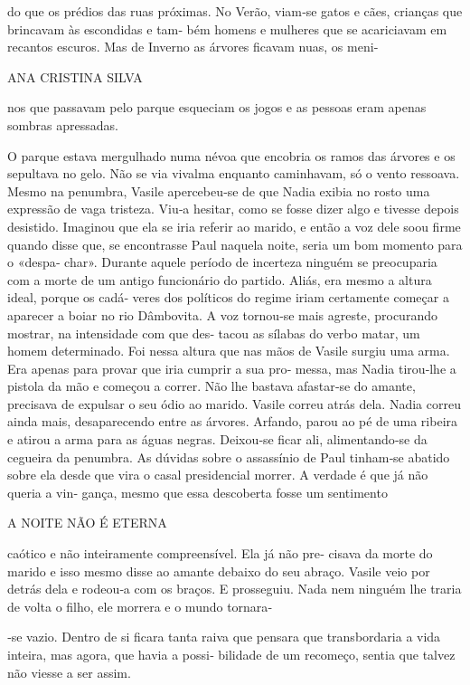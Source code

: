 do que os prédios das ruas próximas. No Verão, viam‑se gatos e cães,
crianças que brincavam às escondidas e tam‑ bém homens e mulheres que se
acariciavam em recantos escuros. Mas de Inverno as árvores ficavam nuas,
os meni‑

ANA CRISTINA SILVA

nos que passavam pelo parque esqueciam os jogos e as pessoas eram apenas
sombras apressadas.

O parque estava mergulhado numa névoa que encobria os ramos das árvores
e os sepultava no gelo. Não se via vivalma enquanto caminhavam, só o
vento ressoava. Mesmo na penumbra, Vasile apercebeu‑se de que Nadia
exibia no rosto uma expressão de vaga tristeza. Viu‑a hesitar, como se
fosse dizer algo e tivesse depois desistido. Imaginou que ela se iria
referir ao marido, e então a voz dele soou firme quando disse que, se
encontrasse Paul naquela noite, seria um bom momento para o «despa‑
char». Durante aquele período de incerteza ninguém se preocuparia com a
morte de um antigo funcionário do partido. Aliás, era mesmo a altura
ideal, porque os cadá‑ veres dos políticos do regime iriam certamente
começar a aparecer a boiar no rio Dâmbovita. A voz tornou‑se mais
agreste, procurando mostrar, na intensidade com que des‑ tacou as
sílabas do verbo matar, um homem determinado. Foi nessa altura que nas
mãos de Vasile surgiu uma arma. Era apenas para provar que iria cumprir
a sua pro‑ messa, mas Nadia tirou‑lhe a pistola da mão e começou a
correr. Não lhe bastava afastar‑se do amante, precisava de expulsar o
seu ódio ao marido. Vasile correu atrás dela. Nadia correu ainda mais,
desaparecendo entre as árvores. Arfando, parou ao pé de uma ribeira e
atirou a arma para as águas negras. Deixou‑se ficar ali, alimentando‑se
da cegueira da penumbra. As dúvidas sobre o assassínio de Paul tinham‑se
abatido sobre ela desde que vira o casal presidencial morrer. A verdade
é que já não queria a vin‑ gança, mesmo que essa descoberta fosse um
sentimento

A NOITE NÃO É ETERNA

caótico e não inteiramente compreensível. Ela já não pre‑ cisava da
morte do marido e isso mesmo disse ao amante debaixo do seu abraço.
Vasile veio por detrás dela e rodeou‑a com os braços. E prosseguiu. Nada
nem ninguém lhe traria de volta o filho, ele morrera e o mundo tornara‑

‑se vazio. Dentro de si ficara tanta raiva que pensara que transbordaria
a vida inteira, mas agora, que havia a possi‑ bilidade de um recomeço,
sentia que talvez não viesse a ser assim.

